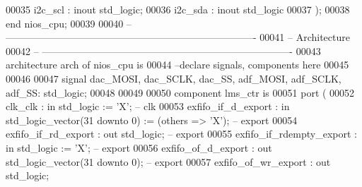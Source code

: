 \begin{DoxyCode}
00035       \textcolor{vhdlchar}{i2c_scl}           \textcolor{vhdlchar}{:} \textcolor{keywordflow}{inout} \textcolor{comment}{std\_logic};
00036       \textcolor{vhdlchar}{i2c_sda}           \textcolor{vhdlchar}{:} \textcolor{keywordflow}{inout} \textcolor{comment}{std\_logic}
00037         \textcolor{vhdlchar}{)};
00038 \textcolor{keywordflow}{end} \textcolor{vhdlchar}{nios\_cpu};
00039 
00040 \textcolor{keyword}{-- ----------------------------------------------------------------------------}
00041 \textcolor{keyword}{-- Architecture}
00042 \textcolor{keyword}{-- ----------------------------------------------------------------------------}
00043 \textcolor{keywordflow}{architecture} arch \textcolor{keywordflow}{of} nios_cpu is
00044 \textcolor{keyword}{--declare signals,  components here}
00045 
00046 
00047 \textcolor{keywordflow}{signal} \textcolor{vhdlchar}{dac_MOSI}\textcolor{vhdlchar}{,} \textcolor{vhdlchar}{dac_SCLK}\textcolor{vhdlchar}{,} \textcolor{vhdlchar}{dac_SS}\textcolor{vhdlchar}{,} \textcolor{vhdlchar}{adf_MOSI}\textcolor{vhdlchar}{,} \textcolor{vhdlchar}{adf_SCLK}\textcolor{vhdlchar}{,} \textcolor{vhdlchar}{adf_SS}\textcolor{vhdlchar}{:} \textcolor{comment}{std\_logic};
00048 
00049 
00050    \textcolor{keywordflow}{component} lms_ctr \textcolor{keywordflow}{is}
00051       \textcolor{keywordflow}{port} (
00052          clk_clk                                 : \textcolor{keywordflow}{in}    \textcolor{comment}{std\_logic}                    := 'X';             \textcolor{keyword}{
      -- clk}
00053          exfifo_if_d_export                      : \textcolor{keywordflow}{in}    \textcolor{comment}{std\_logic\_vector}(\textcolor{vhdllogic}{}\textcolor{vhdllogic}{31} \textcolor{keywordflow}{downto} \textcolor{vhdllogic}{}\textcolor{vhdllogic}{0}) := (\textcolor{keywordflow}{others} => 'X'); \textcolor{keyword}{
      -- export}
00054          exfifo_if_rd_export                     : \textcolor{keywordflow}{out}   \textcolor{comment}{std\_logic};                                       \textcolor{keyword}{
      -- export}
00055          exfifo_if_rdempty_export                : \textcolor{keywordflow}{in}    \textcolor{comment}{std\_logic}                    := 'X';             \textcolor{keyword}{
      -- export}
00056          exfifo_of_d_export                      : \textcolor{keywordflow}{out}   \textcolor{comment}{std\_logic\_vector}(\textcolor{vhdllogic}{}\textcolor{vhdllogic}{31} \textcolor{keywordflow}{downto} \textcolor{vhdllogic}{}\textcolor{vhdllogic}{0});                    \textcolor{keyword}{
      -- export}
00057          exfifo_of_wr_export                     : \textcolor{keywordflow}{out}   \textcolor{comment}{std\_logic};                                       \textcolor{keyword}{
}
\end{DoxyCode}

